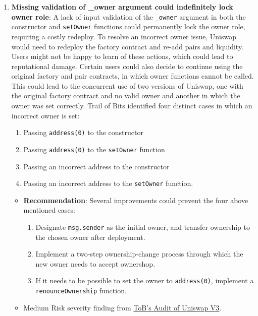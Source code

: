 \begin{enumerate}
\item\textbf{Missing validation of \_owner argument could indefinitely lock owner role}: A lack of input validation of the \verb|_owner| argument in both the constructor and \verb|setOwner| functions could permanently lock the owner role, requiring a costly redeploy. To resolve an incorrect owner issue, Uniswap would need to redeploy the factory contract and re-add pairs and liquidity. Users might not be happy to learn of these actions, which could lead to reputational damage. Certain users could also decide to continue using the original factory and pair contracts, in which owner functions cannot be called. This could lead to the concurrent use of two versions of Uniswap, one with the original factory contract and no valid owner and another in which the owner was set correctly. Trail of Bits identified four distinct cases in which an incorrect owner is set:
    \begin{enumerate}
    \item Passing \verb|address(0)| to the constructor
    \item Passing \verb|address(0)| to the \verb|setOwner| function
    \item Passing an incorrect address to the constructor
    \item Passing an incorrect address to the \verb|setOwner| function.
    \end{enumerate}
	\begin{itemize}
	\item\textbf{Recommendation}: Several improvements could prevent the four above mentioned cases:
	    \begin{enumerate}
	    \item Designate \verb|msg.sender| as the initial owner, and transfer ownership to the chosen owner after deployment.
	    \item Implement a two-step ownership-change process through which the new owner needs to accept ownershop.
	    \item If it needs to be possible to set the owner to \verb|address(0)|, implement a \verb|renounceOwnership| function.
	    \end{enumerate}
	\item Medium Risk severity finding from \href{https://github.com/Uniswap/uniswap-v3-core/blob/main/audits/tob/audit.pdf}{ToB’s Audit of Uniswap V3}.
	\end{itemize}


\end{enumerate}
